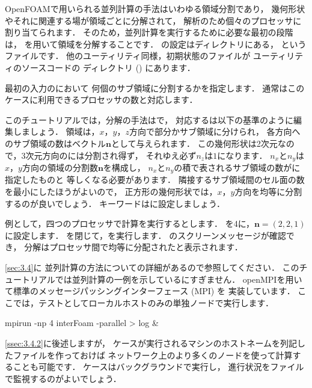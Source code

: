 OpenFOAMで用いられる並列計算の手法はいわゆる領域分割であり，
幾何形状やそれに関連する場が領域ごとに分解されて，
解析のため個々のプロセッサに割り当てられます．
そのため，並列計算を実行するために必要な最初の段階は，
を用いて領域を分解することです．
の設定はディレクトリにある，
というファイルです．
他のユーティリティ同様，初期状態のファイルが
ユーティリティのソースコードの
ディレクトリ () にあります．

最初の入力のにおいて
何個のサブ領域に分割するかを指定します．
通常はこのケースに利用できるプロセッサの数と対応します．

このチュートリアルでは，分解の手法はで，
対応するは以下の基準のように編集しましょう．
領域は，$x$，$y$，$z$方向で部分かサブ領域に分けられ，
各方向へのサブ領域の数はベクトル$\bm{n}$として与えられます．
この幾何形状は2次元なので，3次元方向のには分割され得ず，
それゆえ必ず$n_{z}$は$1$になります．
$n_{x}$と$n_{y}$は$x$，$y$方向の領域の分割数$\bm{n}$を構成し，
$n_{x}$と$n_{y}$の積で表されるサブ領域の数がに指定したものと
等しくなる必要があります．
隣接するサブ領域間のセル面の数を最小にしたほうがよいので，
正方形の幾何形状では，$x$，$y$方向を均等に分割するのが良いでしょう．
キーワードはに設定しましょう．

例として，四つのプロセッサで計算を実行するとします．
を4に，$\bm{n} = (2, 2, 1)$に設定します．
を閉じて，を実行します．
のスクリーンメッセージが確認でき，
分解はプロセッサ間で均等に分配されたと表示されます．

\autoref{sec:3.4}に
並列計算の方法についての詳細があるので参照してください．
このチュートリアルでは並列計算の一例を示しているにすぎません．
openMPIを用いて標準のメッセージパッシングインターフェース (MPI) を
実装しています．
ここでは，テストとしてローカルホストのみの単独ノードで実行します．
\begin{OFverbatim}[terminal]
mpirun -np 4 interFoam -parallel > log &
\end{OFverbatim}
\autoref{ssec:3.4.2}に後述しますが，
ケースが実行されるマシンのホストネームを列記したファイルを作っておけば
ネットワーク上のより多くのノードを使って計算することも可能です．
ケースはバックグラウンドで実行し，
進行状況をファイルで監視するのがよいでしょう．


